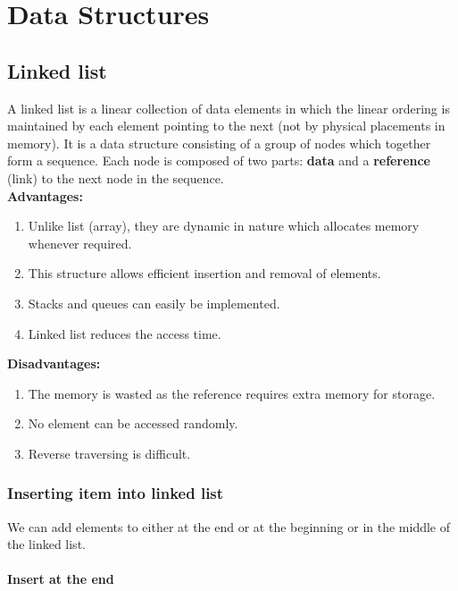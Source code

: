 \documentclass[a4paper,11pt]{book}
\begin{document}
\chapter{Data Structures}

\section{Linked list}

A linked list is a linear collection of data elements in which the linear ordering is maintained by each element pointing to the next (not by physical placements in memory). It is a data structure consisting of a group of nodes which together form a sequence. Each node is composed of two parts: \textbf{data} and a \textbf{reference} (link) to the next node in the sequence.\\

\textbf{Advantages:}
\begin{enumerate}
	\item Unlike list (array), they are dynamic in nature which allocates memory whenever required.
	\item This structure allows efficient insertion and removal of elements.
	\item Stacks and queues can easily be implemented.
	\item Linked list reduces the access time.
\end{enumerate}

\textbf{Disadvantages:}
\begin{enumerate}
	\item The memory is wasted as the reference requires extra memory for storage.
	\item No element can be accessed randomly.
	\item Reverse traversing is difficult.
\end{enumerate}

\subsection{Inserting item into linked list}

\noindent We can add elements to either at the end or at the beginning or in the middle of the linked list.

\subsubsection{Insert at the end}
\end{document}
